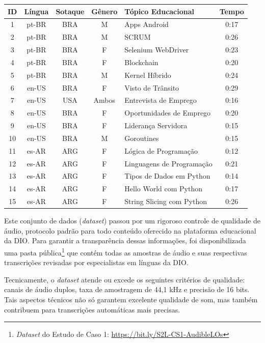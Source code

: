 \begin{quadro}[htb]
\centering
\caption{\textit{Dataset} do Estudo de Caso 1 (Áudios Extraídos das Videoaulas)}
\label{quadro:c4:poc-audios-summary}
\begin{tabular}{c|c|c|c|l|c}
\hline
\textbf{ID} & \textbf{Língua} & \textbf{Sotaque} & \textbf{Gênero} & \textbf{Tópico Educacional} & \textbf{Tempo} \\ \hline
1 & pt-BR & BRA & M & Apps Android & 0:17 \\ \hline
2 & pt-BR & BRA & M & SCRUM & 0:26 \\ \hline
3 & pt-BR & BRA & F & Selenium WebDriver & 0:23 \\ \hline
4 & pt-BR & BRA & F & Blockchain & 0:20 \\ \hline
5 & pt-BR & BRA & M & Kernel Híbrido & 0:24 \\ \hline
6 & en-US & BRA & F & Visto de Trânsito & 0:29 \\ \hline
7 & en-US & USA & Ambos & Entrevista de Emprego & 0:16 \\  \hline
8 & en-US & BRA & F & Oportunidades de Emprego & 0:20 \\  \hline
9 & en-US & BRA & F & Liderança Servidora & 0:15 \\  \hline
10 & en-US & BRA & M & Goroutines & 0:15 \\  \hline
11 & es-AR & ARG & F & Lógica de Programação & 0:12 \\  \hline
12 & es-AR & ARG & F & Linguagens de Programação & 0:21 \\  \hline
13 & es-AR & ARG & F & Tipos de Dados em Python & 0:14 \\  \hline
14 & es-AR & ARG & F & Hello World com Python & 0:17 \\  \hline
15 & es-AR & ARG & F & String Slicing com Python & 0:26 \\ \hline
\end{tabular}
\end{quadro}

Este conjunto de dados (\textit{dataset}) passou por um rigoroso controle de qualidade de áudio, protocolo padrão para todo conteúdo oferecido na plataforma educacional da DIO. Para garantir a transparência dessas informações, foi disponibilizada uma pasta pública\footnote{\textit{Dataset} do Estudo de Caso 1: \url{https://bit.ly/S2L-CS1-AudibleLOs}} que contém todas as amostras de áudio e suas respectivas transcrições revisadas por especialistas em línguas da DIO. 

Tecnicamente, o \textit{dataset} atende ou excede os seguintes critérios de qualidade: canais de áudio duplos, taxa de amostragem de 44,1 kHz e precisão de 16 bits. Tais aspectos técnicos não só garantem excelente qualidade de som, mas também contribuem para transcrições automáticas mais precisas.

